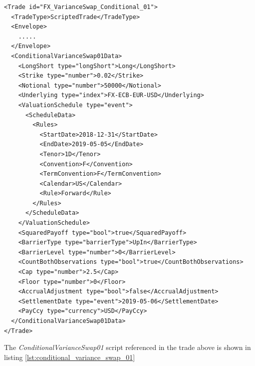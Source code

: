 \begin{verbatim}
<Trade id="FX_VarianceSwap_Conditional_01">
  <TradeType>ScriptedTrade</TradeType>
  <Envelope>
    .....
  </Envelope>
  <ConditionalVarianceSwap01Data>
    <LongShort type="longShort">Long</LongShort>
    <Strike type="number">0.02</Strike>
    <Notional type="number">50000</Notional>
    <Underlying type="index">FX-ECB-EUR-USD</Underlying>
    <ValuationSchedule type="event">
      <ScheduleData>
        <Rules>
          <StartDate>2018-12-31</StartDate>
          <EndDate>2019-05-05</EndDate>
          <Tenor>1D</Tenor>
          <Convention>F</Convention>
          <TermConvention>F</TermConvention>
          <Calendar>US</Calendar>
          <Rule>Forward</Rule>
        </Rules>
      </ScheduleData>
    </ValuationSchedule>
    <SquaredPayoff type="bool">true</SquaredPayoff>
    <BarrierType type="barrierType">UpIn</BarrierType>
    <BarrierLevel type="number">0</BarrierLevel>
    <CountBothObservations type="bool">true</CountBothObservations>
    <Cap type="number">2.5</Cap>
    <Floor type="number">0</Floor>
    <AccrualAdjustment type="bool">false</AccrualAdjustment>
    <SettlementDate type="event">2019-05-06</SettlementDate>
    <PayCcy type="currency">USD</PayCcy>
  </ConditionalVarianceSwap01Data>
</Trade>
\end{verbatim}

The \emph{ConditionalVarianceSwap01} script referenced in the trade above is shown in listing
\ref{lst:conditional_variance_swap_01}

